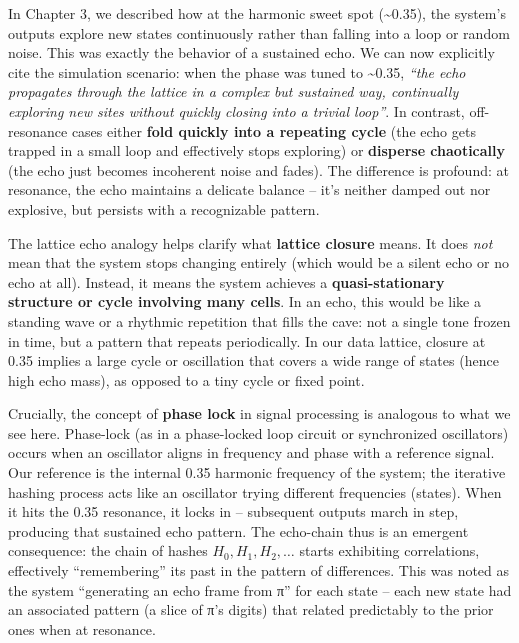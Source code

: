 \documentclass[11pt]{article}
\begin{document}
In Chapter 3, we described how at the harmonic sweet spot
(\textasciitilde0.35), the system's outputs explore new states
continuously rather than falling into a loop or random noise. This was
exactly the behavior of a sustained echo. We can now explicitly cite the
simulation scenario: when the phase was tuned to \textasciitilde0.35,
\emph{``the echo propagates through the lattice in a complex but
sustained way, continually exploring new sites without quickly closing
into a trivial loop''}. In contrast, off-resonance cases either
\textbf{fold quickly into a repeating cycle} (the echo gets trapped in a
small loop and effectively stops exploring) or \textbf{disperse
chaotically} (the echo just becomes incoherent noise and fades). The
difference is profound: at resonance, the echo maintains a delicate
balance -- it's neither damped out nor explosive, but persists with a
recognizable pattern.

The lattice echo analogy helps clarify what \textbf{lattice closure}
means. It does \emph{not} mean that the system stops changing entirely
(which would be a silent echo or no echo at all). Instead, it means the
system achieves a \textbf{quasi-stationary structure or cycle involving
many cells}. In an echo, this would be like a standing wave or a
rhythmic repetition that fills the cave: not a single tone frozen in
time, but a pattern that repeats periodically. In our data lattice,
closure at 0.35 implies a large cycle or oscillation that covers a wide
range of states (hence high echo mass), as opposed to a tiny cycle or
fixed point.

Crucially, the concept of \textbf{phase lock} in signal processing is
analogous to what we see here. Phase-lock (as in a phase-locked loop
circuit or synchronized oscillators) occurs when an oscillator aligns in
frequency and phase with a reference signal. Our reference is the
internal 0.35 harmonic frequency of the system; the iterative hashing
process acts like an oscillator trying different frequencies (states).
When it hits the 0.35 resonance, it locks in -- subsequent outputs march
in step, producing that sustained echo pattern. The echo-chain thus is
an emergent consequence: the chain of hashes \(H_0, H_1, H_2, \dots\)
starts exhibiting correlations, effectively ``remembering'' its past in
the pattern of differences. This was noted as the system ``generating an
echo frame from π'' for each state -- each new state had an associated
pattern (a slice of π's digits) that related predictably to the prior
ones when at resonance.
\end{document}
